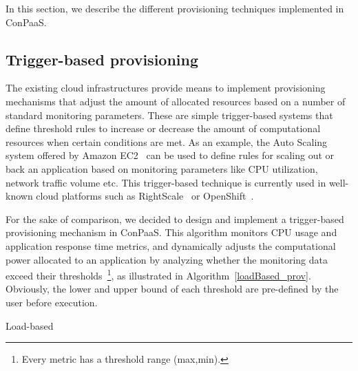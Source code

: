 In this section, we describe the different provisioning techniques implemented in ConPaaS.



\subsection*{Trigger-based provisioning}




The existing cloud infrastructures provide means to implement
provisioning mechanisms that adjust the amount of allocated 
resources based on a number of standard monitoring parameters. 
These are simple trigger-based systems that define threshold 
rules to increase or decrease the amount of computational resources
when certain conditions are met. As an example, the Auto Scaling 
system offered by Amazon EC2~\cite{amazonEC2} can be used to define 
rules for scaling out or back an application based on monitoring
parameters like CPU utilization, network traffic volume etc. 
This trigger-based technique is currently used in well-known 
cloud platforms such as RightScale~\cite{right-scale} or OpenShift~\cite{openshift}. 

For the sake of comparison, we decided to design and implement a 
trigger-based provisioning mechanism in ConPaaS. This algorithm 
monitors CPU usage and application response time metrics, and 
dynamically adjusts the computational power allocated to an application by analyzing whether the monitoring data exceed their thresholds~\footnote{Every metric has a threshold range (max,min).}, as illustrated in Algorithm~\ref{loadBased_prov}. Obviously, the lower and upper bound of each threshold are pre-defined by the user before execution.

\begin{algorithm}
{\scriptsize
\SetAlgoLined
\SetInd{0mm}{2mm}
\BlankLine
\While{auto-scaling is ON}{
Collect monitoring data of each metric, \emph{data}\;
\BlankLine
\If{ no recent scaling operation}{
\uIf{ avg(data$_i$) $>=$ \emph{threshold\_min}$_i$  }{
ADD resources\;
}
\ElseIf{ avg(data$_i$) $<$ \emph{threshold\_max}$_i$  }{
REMOVE resources\;
} 
} 
Sleep for 5 minutes \; 
}
}
\caption{Load-based}
\label{loadBased_prov}
\end{algorithm}

